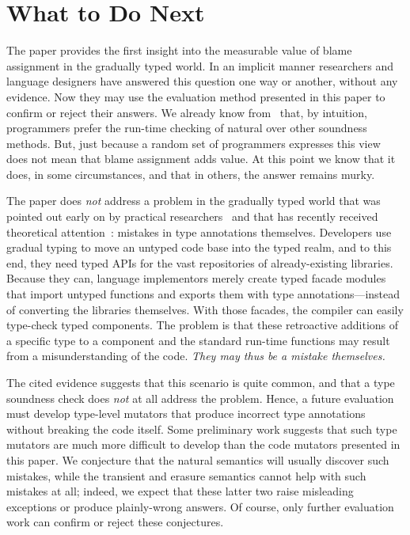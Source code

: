 \section{What to Do Next} 

The paper provides the first insight into the measurable value of blame
assignment in the gradually typed world. In an implicit manner researchers and
language designers have answered this question one way or another, without any
evidence. Now they may use the evaluation method presented in this paper to
confirm or reject their answers. We already know from~\citet{tgpk-dls-2018}
that, by intuition, programmers prefer the run-time checking of natural over
other soundness methods. But, just because a random set of programmers expresses
this view does not mean that blame assignment adds value. At this point we know
that it does, in some circumstances, and that in others, the answer remains
murky.

The paper does {\em not\/} address a problem in the gradually typed world that
was pointed out early on by practical researchers~\cite{incorrect-ts,
sta-nt-base-types, wmwz-ecoop-2017} and that has recently received theoretical
attention~\cite{gfd-oopsla-2019}: mistakes in type annotations themselves.
Developers use gradual typing to move an untyped code base into the typed realm,
and to this end, they need typed APIs for the vast repositories of
already-existing libraries. Because they can, language implementors merely
create typed facade modules that import untyped functions and exports them with
type annotations---instead of converting the libraries themselves. With those
facades, the compiler can easily type-check typed components. The problem is
that these retroactive additions of a specific type to a component and the
standard run-time functions may result from a misunderstanding of the
code. \emph{They may thus be a mistake themselves.}

The cited evidence suggests that this scenario is quite common, and that a type
soundness check does {\em not\/} at all address the problem.  Hence, a future
evaluation must develop type-level mutators that produce incorrect type
annotations without breaking the code itself. Some preliminary work suggests
that such type mutators are much more difficult to develop than the code
mutators presented in this paper. We conjecture that the natural semantics will
usually discover such mistakes, while the transient and erasure semantics cannot
help with such mistakes at all; indeed, we expect that these latter two raise
misleading exceptions or produce plainly-wrong answers.  Of course, only further
evaluation work can confirm or reject these conjectures.



